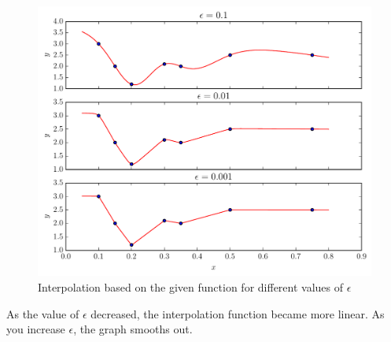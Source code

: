 \documentclass[12pt]{article}
\begin{document}
\begin{enumerate}
\begin{enumerate}
\begin{figure}[H]
\centering
\includegraphics[width=.75\textwidth]{int_plot.pdf}
\caption{Interpolation based on the given function for different values of $\epsilon$}
\end{figure}

As the value of $\epsilon$ decreased, the interpolation function became more linear. As you increase $\epsilon$, the graph smooths out.


\end{enumerate}

\end{enumerate}

\end{document}
